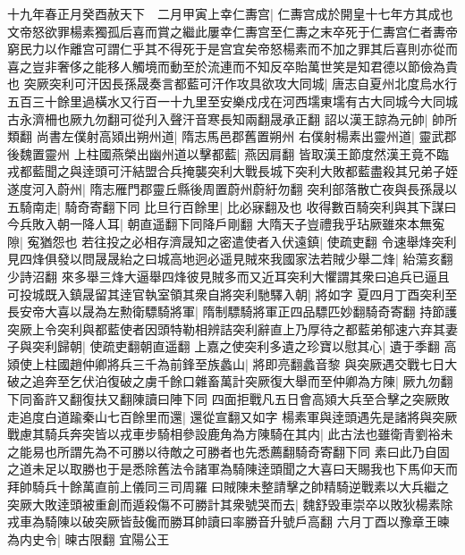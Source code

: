 十九年春正月癸酉赦天下　二月甲寅上幸仁夀宫|{
	仁夀宫成於開皇十七年方其成也文帝怒欲罪楊素獨孤后喜而賞之繼此屢幸仁夀宫至仁夀之末卒死于仁夀宫仁者夀帝窮民力以作離宫可謂仁乎其不得死于是宫宜矣帝怒楊素而不加之罪其后喜則亦從而喜之豈非奢侈之能移人觸境而動至於流連而不知反卒貽萬世笑是知君德以節儉為貴也}
突厥突利可汗因長孫晟奏言都藍可汗作攻具欲攻大同城|{
	唐志自夏州北度烏水行五百三十餘里過橫水又行百一十九里至安樂戍戌在河西壖東壖有古大同城今大同城古永濟柵也厥九勿翻可從刋入聲汗音寒長知兩翻晟承正翻}
詔以漢王諒為元帥|{
	帥所類翻}
尚書左僕射高熲出朔州道|{
	隋志馬邑郡舊置朔州}
右僕射楊素出靈州道|{
	靈武郡後魏置靈州}
上柱國燕榮出幽州道以擊都藍|{
	燕因肩翻}
皆取漢王節度然漢王竟不臨戎都藍聞之與逹頭可汗結盟合兵掩襲突利大戰長城下突利大敗都藍盡殺其兄弟子姪遂度河入蔚州|{
	隋志雁門郡靈丘縣後周置蔚州蔚紆勿翻}
突利部落散亡夜與長孫晟以五騎南走|{
	騎奇寄翻下同}
比旦行百餘里|{
	比必寐翻及也}
收得數百騎突利與其下謀曰今兵敗入朝一降人耳|{
	朝直遥翻下同降戶剛翻}
大隋天子豈禮我乎玷厥雖來本無寃隙|{
	寃猶怨也}
若往投之必相存濟晟知之密遣使者入伏遠鎮|{
	使疏吏翻}
令速舉烽突利見四烽俱發以問晟晟紿之曰城高地迥必遥見賊來我國家法若賊少舉二烽|{
	紿蕩亥翻少詩沼翻}
來多舉三烽大逼舉四烽彼見賊多而又近耳突利大懼謂其衆曰追兵已逼且可投城既入鎮晟留其逹官執室領其衆自將突利馳驛入朝|{
	將如字}
夏四月丁酉突利至長安帝大喜以晟為左勲衛驃騎將軍|{
	隋制驃騎將軍正四品驃匹妙翻騎奇寄翻}
持節護突厥上令突利與都藍使者因頭特勒相辨詰突利辭直上乃厚待之都藍弟郁速六弃其妻子與突利歸朝|{
	使疏吏翻朝直遥翻}
上嘉之使突利多遺之珍寶以慰其心|{
	遺于季翻}
高熲使上柱國趙仲卿將兵三千為前鋒至族蠡山|{
	將即亮翻蠡音黎}
與突厥遇交戰七日大破之追奔至乞伏泊復破之虜千餘口雜畜萬計突厥復大舉而至仲卿為方陳|{
	厥九勿翻下同畜許又翻復扶又翻陳讀曰陣下同}
四面拒戰凡五日會高熲大兵至合擊之突厥敗走追度白道踰秦山七百餘里而還|{
	還從宣翻又如字}
楊素軍與逹頭遇先是諸將與突厥戰慮其騎兵奔突皆以戎車步騎相參設鹿角為方陳騎在其内|{
	此古法也雖衛青劉裕未之能易也所謂先為不可勝以待敵之可勝者也先悉薦翻騎奇寄翻下同}
素曰此乃自固之道未足以取勝也于是悉除舊法令諸軍為騎陳逹頭聞之大喜曰天賜我也下馬仰天而拜帥騎兵十餘萬直前上儀同三司周羅曰賊陳未整請擊之帥精騎逆戰素以大兵繼之突厥大敗逹頭被重創而遁殺傷不可勝計其衆號哭而去|{
	魏舒毁車崇卒以敗狄楊素除戎車為騎陳以破突厥皆鼔儳而勝耳帥讀曰率勝音升號戶高翻}
六月丁酉以豫章王暕為内史令|{
	暕古限翻}
宜陽公王

